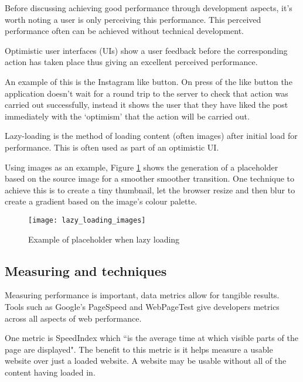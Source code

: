 Before discussing achieving good performance through development aspects, it's worth noting a user is only perceiving this performance. This perceived performance often can be achieved without technical development.

Optimistic user interfaces (UIs) show a user feedback before the corresponding action has taken place thus giving an excellent perceived performance.

An example of this is the Instagram like button. On press of the like button the application doesn't wait for a round trip to the server to check that action was carried out successfully, instead it shows the user that they have liked the post immediately with the `optimism' that the action will be carried out. \cite{performing_actions_optimisitically}

Lazy-loading is the method of loading content (often images) after initial load for performance. This is often used as part of an optimistic UI.

Using images as an example, Figure \ref{figure-lazy-loading-images} shows the generation of a placeholder based on the source image for a smoother smoother transition. One technique to achieve this is to create a tiny thumbnail, let the browser resize and then blur to create a gradient based on the image's colour palette. \cite{image_colours_lazy_loading}

\begin{figure}[H]
  \centering
    \texttt{[image: lazy\_loading\_images]}
  \caption{Example of placeholder when lazy loading \protect\cite{image_colours_lazy_loading}}
  \label{figure-lazy-loading-images}
\end{figure}

\subsection{Measuring and techniques} \label{l-r--measuring-and-techniques}

Measuring performance is important, data metrics allow for tangible results. Tools such as Google's PageSpeed and WebPageTest give developers metrics across all aspects of web performance.

One metric is SpeedIndex which ``is the average time at which visible parts of the page are displayed". The benefit to this metric is it helps measure a usable website over just a loaded website. A website may be usable without all of the content having loaded in. \cite{speed_index}

